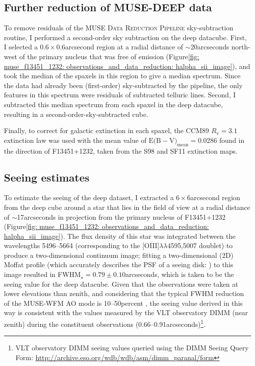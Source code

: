 \subsection{Further reduction of MUSE-DEEP data}
\label{section: section: muse_f13451_1232: observations_and_data_reduction: further_reduction}

To remove residuals of the \textsc{MUSE Data Reduction Pipeline} sky-subtraction routine, I performed a second-order sky subtraction on the deep datacube. First, I selected a $0.6\times0.6$\;arcsecond region at a radial distance of $\sim$20\;arcseconds north-west of the primary nucleus that was free of emission (Figure\;\ref{fig: muse_f13451_1232: observations_and_data_reduction: halpha_sii_image}), and took the median of the spaxels in this region to give a median spectrum. Since the data had already been (first-order) sky-subtracted by the pipeline, the only features in this spectrum were residuals of subtracted telluric lines. Second, I subtracted this median spectrum from each spaxel in the deep datacube, resulting in a second-order-sky-subtracted cube.

Finally, to correct for galactic extinction in each spaxel, the CCM89 $R_\mathrm{v}=3.1$ extinction law was used with the mean value of $\mathrm{E(B}-\mathrm{V)}_\mathrm{mean}=0.0286$ found in the direction of F13451+1232, taken from the S98 and SF11 extinction maps.

\subsection{Seeing estimates}
\label{section: muse_f13451_1232: observations_and_data_reduction: seeing}

To estimate the seeing of the deep dataset, I extracted a $6\times6$\;arcsecond region from the deep cube around a star that lies in the field of view at a radial distance of $\sim$17\;arcseconds in projection from the primary nucleus of F13451+1232 (Figure\;\ref{fig: muse_f13451_1232: observations_and_data_reduction: halpha_sii_image}). The flux density of this star was integrated between the wavelengths 5496--5664\;{\AA} (corresponding to the [OIII]$\lambda\lambda$4595,5007 doublet) to produce a two-dimensional continuum image; fitting a two-dimensional (2D) Moffat profile (which accurately describes the PSF of a seeing disk: \citealt{Moffat1969}) to this image resulted in FWHM$_\star=0.79\pm0.10$\;arcseconds, which is taken to be the seeing value for the deep datacube. Given that the observations were taken at lower elevations than zenith, and considering that the typical FWHM reduction of the MUSE-WFM AO mode is 10--50\;per\;cent \citep{Fusco2020}, the seeing value derived in this way is consistent with the values measured by the VLT observatory DIMM (near zenith) during the constituent observations (0.66--0.91\;arcseconds)\footnote{VLT observatory DIMM seeing values queried using the DIMM Seeing Query Form: \url{http://archive.eso.org/wdb/wdb/asm/dimm_paranal/form}}.


